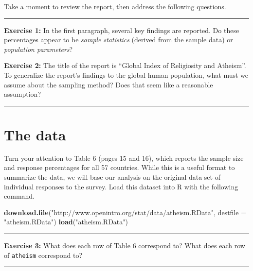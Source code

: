 \documentclass[]{book}
\newenvironment{Shaded}{\begin{snugshade}}{\end{snugshade}}
\newcommand{\KeywordTok}[1]{\textcolor[rgb]{0.13,0.29,0.53}{\textbf{#1}}}
\newcommand{\DataTypeTok}[1]{\textcolor[rgb]{0.13,0.29,0.53}{#1}}
\newcommand{\StringTok}[1]{\textcolor[rgb]{0.31,0.60,0.02}{#1}}
\newcommand{\NormalTok}[1]{#1}
\theoremstyle{definition}
\theoremstyle{definition}
\theoremstyle{definition}
\theoremstyle{remark}
\begin{document}
Take a moment to review the report, then address the following
questions.

\begin{center}\rule{0.5\linewidth}{\linethickness}\end{center}

\textbf{Exercise 1:} In the first paragraph, several key findings are
reported. Do these percentages appear to be \emph{sample statistics}
(derived from the sample data) or \emph{population parameters}?

\textbf{Exercise 2:} The title of the report is ``Global Index of
Religiosity and Atheism''. To generalize the report's findings to the
global human population, what must we assume about the sampling method?
Does that seem like a reasonable assumption?

\begin{center}\rule{0.5\linewidth}{\linethickness}\end{center}

\section{The data}\label{the-data-3}

Turn your attention to Table 6 (pages 15 and 16), which reports the
sample size and response percentages for all 57 countries. While this is
a useful format to summarize the data, we will base our analysis on the
original data set of individual responses to the survey. Load this
dataset into R with the following command.

\begin{Shaded}
\begin{Highlighting}[]
\KeywordTok{download.file}\NormalTok{(}\StringTok{"http://www.openintro.org/stat/data/atheism.RData"}\NormalTok{, }\DataTypeTok{destfile =} \StringTok{"atheism.RData"}\NormalTok{)}
\KeywordTok{load}\NormalTok{(}\StringTok{"atheism.RData"}\NormalTok{)}
\end{Highlighting}
\end{Shaded}

\begin{center}\rule{0.5\linewidth}{\linethickness}\end{center}

\textbf{Exercise 3:} What does each row of Table 6 correspond to? What
does each row of \texttt{atheism} correspond to?

\begin{center}\rule{0.5\linewidth}{\linethickness}\end{center}
\end{document}

